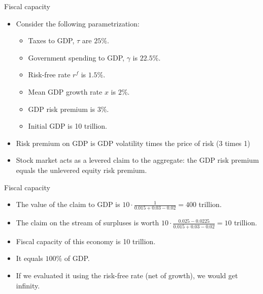 \documentclass[11pt,xcolor={dvipsnames},aspectratio=159,hyperref={pdftex,pdfpagemode=UseNone,hidelinks,pdfdisplaydoctitle=true},usepdftitle=false]{beamer}
\begin{document}
\begin{frame}{Fiscal capacity}  
    \begin{itemize}
        \item Consider the following parametrization: \begin{itemize}
        \item Taxes to GDP, $\tau$ are $25\%$.
        \item Government spending to GDP, $\gamma$ is $22.5\%$.
        \item Risk-free rate $r^f$ is $1.5\%$.
        \item Mean GDP growth rate $x$ is $2\%$.
        \item GDP risk premium is $3\%$.
        \item Initial GDP is 10 trillion.
        \end{itemize}
        \item Risk premium on GDP is GDP volatility times the price of risk (3 times 1)
        \item Stock market acts as a levered claim to the aggregate: the GDP risk premium equals the unlevered equity risk premium. 
        
     \end{itemize}
\end{frame}

\begin{frame}{Fiscal capacity}  
    \begin{itemize}
        \item The value of the claim to GDP is $10\cdot \frac{1}{0.015+0.03-0.02} = 400$ trillion.
        \item The claim on the stream of surpluses is worth $10\cdot \frac{0.025-0.0225}{0.015+0.03-0.02} = 10$ trillion.
        \item Fiscal capacity of this economy is 10 trillion. 
        \item It equals $100\%$ of GDP.
        \item If we evaluated it using the risk-free rate (net of growth), we would get infinity.
    \end{itemize}
\end{frame}
\end{document}
